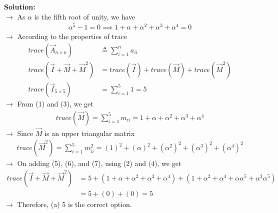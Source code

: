\documentclass[journal]{IEEEtran}
\begin{document}
\textbf{Solution:}\\
$\rightarrow$ As $\alpha$ is the fifth root of unity, we have
\begin{align}
    \alpha^5 - 1 = 0 \implies 1 + \alpha + \alpha^2 + \alpha^3 + \alpha^4 = 0
\end{align}
$\rightarrow$ According to the properties of trace
\begin{align}
    trace(\vec{A}_{n\times n}) &\triangleq \sum_{i=1}^{n} a_{ii} \\
    trace(\vec{I}+\vec{M}+\vec{M}^2) &= trace(\vec{I})+trace(\vec{M})+trace(\vec{M}^2) \\
    trace(\vec{I}_{5\times5}) &= \sum_{i=1}^{5} 1 = 5
\end{align}
$\rightarrow$ From (1) and (3), we get
\begin{align}
    trace(\vec{M}) = \sum_{i=1}^{5} m_{ii} = 1 + \alpha + \alpha^2 + \alpha^3 + \alpha^4
\end{align}
$\rightarrow$ Since $\vec{M}$ is an upper triangular matrix
\begin{align}
    trace(\vec{M}^2) = \sum_{i=1}^{5} m_{ii}^2 = (1)^2 + (\alpha)^2 + (\alpha^2)^2 + (\alpha^3)^2 + (\alpha^4)^2
\end{align}
$\rightarrow$ On adding (5), (6), and (7), using (2) and (4), we get
\begin{align}
    trace(\vec{I}+\vec{M}+\vec{M}^2) &= 5 + (1 + \alpha + \alpha^2 + \alpha^3 + \alpha^4) + (1 + \alpha^2 + \alpha^4 + \alpha\alpha^5 + \alpha^3\alpha^5) \\
    &= 5 + (0) + (0) = 5
\end{align}
$\rightarrow$ Therefore, (a) 5 is the correct option.
\end{document}
